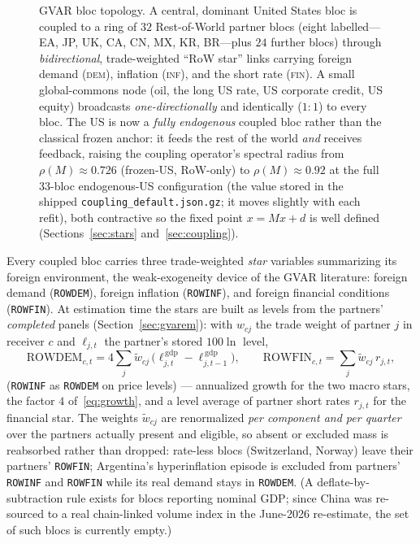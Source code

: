 \documentclass[11pt]{article}
\theoremstyle{plain}
\theoremstyle{remark}
\begin{document}
\begin{figure}[!ht]
\begin{tikzpicture}
\end{tikzpicture}
\caption{GVAR bloc topology. A central, dominant United States bloc is coupled to
a ring of $32$ Rest-of-World partner blocs (eight labelled---EA, JP, UK, CA, CN,
MX, KR, BR---plus $24$ further blocs) through \emph{bidirectional},
trade-weighted ``RoW star'' links carrying foreign demand (\textsc{dem}),
inflation (\textsc{inf}), and the short rate (\textsc{fin}). A small global-commons
node (oil, the long US rate, US corporate credit, US equity) broadcasts
\emph{one-directionally} and identically ($1\!:\!1$) to every bloc. The US is now a
\emph{fully endogenous} coupled bloc rather than the classical frozen anchor: it
feeds the rest of the world \emph{and} receives feedback, raising the coupling
operator's spectral radius from $\rho(M)\approx0.726$ (frozen-US, RoW-only) to
$\rho(M)\approx0.92$ at the full $33$-bloc endogenous-US configuration (the value
stored in the shipped \texttt{coupling\_default.json.gz}; it moves slightly with
each refit), both contractive so the fixed point $x = Mx + d$ is well defined
(Sections~\ref{sec:stars} and~\ref{sec:coupling}).}
\label{fig:gvar-topology}
\end{figure}

Every coupled bloc carries three trade-weighted \emph{star} variables
summarizing its foreign environment, the weak-exogeneity device of the
GVAR literature: foreign demand (\texttt{ROWDEM}), foreign inflation
(\texttt{ROWINF}), and foreign financial conditions (\texttt{ROWFIN}).
At estimation time the stars are built as levels from the partners'
\emph{completed} panels (Section~\ref{sec:gvarem}): with $w_{cj}$ the
trade weight of partner $j$ in receiver $c$ and $\ell_{j,t}$ the
partner's stored $100\ln$ level,
\begin{equation}\label{eq:star}
  \text{ROWDEM}_{c,t}
  = 4 \sum_{j} \tilde{w}_{cj}\,
      \bigl(\ell^{\,\text{gdp}}_{j,t} - \ell^{\,\text{gdp}}_{j,t-1}\bigr),
  \qquad
  \text{ROWFIN}_{c,t} = \sum_{j} \tilde{w}_{cj}\, r_{j,t},
\end{equation}
(\texttt{ROWINF} as \texttt{ROWDEM} on price levels) --- annualized
growth for the two macro stars, the factor $4$
of~\eqref{eq:growth}, and a level average of partner short rates
$r_{j,t}$ for the financial star. The weights $\tilde{w}_{cj}$ are
renormalized \emph{per component and per quarter} over the partners
actually present and eligible, so absent or excluded mass is reabsorbed
rather than dropped: rate-less blocs (Switzerland, Norway) leave their
partners' \texttt{ROWFIN}; Argentina's hyperinflation episode is
excluded from partners' \texttt{ROWINF} and \texttt{ROWFIN} while its
real demand stays in \texttt{ROWDEM}. (A deflate-by-subtraction rule
exists for blocs reporting nominal GDP; since China was re-sourced to a
real chain-linked volume index in the June-2026 re-estimate, the set of
such blocs is currently empty.)
\end{document}
